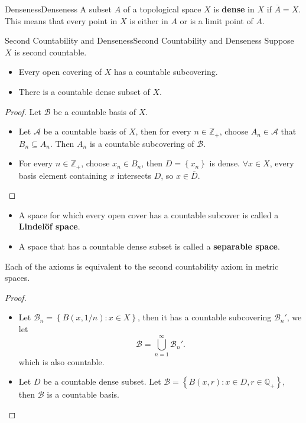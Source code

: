 \documentclass[../main.tex]{subfiles}
\begin{document}
\begin{definition}{Denseness}{Denseness}
	A subset $A$ of a topological space $X$ is \textbf{dense} in $X$ if $\overline{A} = X$. This means that every point in $X$ is either in $A$ or is a limit point of $A$.
\end{definition}

\begin{theorem}{Second Countability and Denseness}{Second Countability and Denseness}
Suppose $X$ is second countable.
\begin{itemize}
\item Every open covering of $X$ has a countable subcovering.
\item There is a countable dense subset of $X$.
\end{itemize}
\end{theorem}
\begin{proof}
	Let $\mathcal{B}$ be a countable basis of $X$.
	\begin{itemize}
		\item Let $\mathcal{A}$ be a countable basis of $X$, then for every $n\in \mathbb{Z}_+$, choose $A_n\in \mathcal{A}$ that $B_n \subseteq A_n$. Then $A_n$ is a countable subcovering of $\mathcal{B}$.
		\item For every $n\in \mathbb{Z}_+$, choose $x_n\in B_n$, then $D = \left\{ x_n \right\}$ is dense. $\forall x\in X$, every basis element containing $x$ intersects $D$, so $x\in \overline{D}$.
	\end{itemize}
\end{proof}

\begin{remark}
\begin{itemize}
	\item A space for which every open cover has a countable subcover is called a \textbf{Lindel\"of space}.
	\item A space that has a countable dense subset is called a \textbf{separable space}.
\end{itemize}
Each of the axioms is equivalent to the second countability axiom in metric spaces.
\begin{proof}
\begin{itemize}
\item Let $\mathcal{B}_n = \left\{ B(x,1 / n):x\in X \right\}$, then it has a countable subcovering $\mathcal{B}_n'$, we let
	\begin{equation*}
		\mathcal{B} = \bigcup_{n=1}^{\infty} \mathcal{B}_n'.
	\end{equation*}
	which is also countable.
\item Let $D$ be a countable dense subset. Let $\mathcal{B} = \left\{ B(x, r):x\in D, r\in \mathbb{Q}_+ \right\}$, then $\mathcal{B}$ is a countable basis.
\end{itemize}
\end{proof}
\end{remark}
\end{document}
